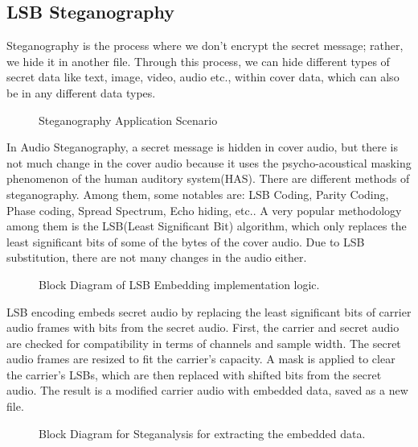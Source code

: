 \documentclass[a4paper]{cas-sc}
\begin{document}
\subsection{LSB Steganography}
\label{sec:steganography}
Steganography is the process where we don't encrypt the secret message; rather, we hide it in another file. Through this process, we can hide different types of secret data like text, image, video, audio etc., within cover data, which can also be in any different data types.\cite{jayaram2011information}\cite{hemeida2021comparative}
\begin{figure}[pos=H]
    \begin{center}
        
        \caption{Steganography Application Scenario}
        \label{fig:stegoApplication}
    \end{center}
\end{figure}

In Audio Steganography, a secret message is hidden in cover audio, but there is not much change in the cover audio because it uses the psycho-acoustical masking phenomenon of the human auditory system(HAS). There are different methods of steganography. Among them, some notables are: LSB Coding, Parity Coding, Phase coding, Spread Spectrum, Echo hiding, etc.\cite{hemeida2021comparative}. A very popular methodology among them is the LSB(Least Significant Bit) algorithm, which only replaces the least significant bits of some of the bytes of the cover audio. Due to LSB substitution, there are not many changes in the audio either.
\begin{figure}[pos=h]
    \begin{center}
        
        \caption{Block Diagram of LSB Embedding implementation logic.}
        \label{fig:stegoEmbed}
    \end{center}
\end{figure}

LSB encoding embeds secret audio by replacing the least significant bits of carrier audio frames with bits from the secret audio. First, the carrier and secret audio are checked for compatibility in terms of channels and sample width. The secret audio frames are resized to fit the carrier's capacity. A mask is applied to clear the carrier's LSBs, which are then replaced with shifted bits from the secret audio. The result is a modified carrier audio with embedded data, saved as a new file.
\begin{figure}[pos=h]
    \begin{center}
        
        \caption{Block Diagram for Steganalysis for extracting the embedded data.}
        \label{fig:stegoExtract}
    \end{center}
\end{figure}
\end{document}

